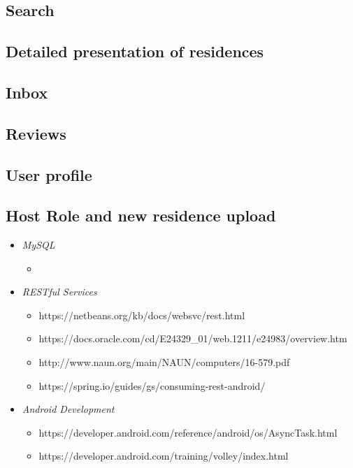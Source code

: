 \documentclass[12pt]{article}
\begin{document}
	\subsection{Search}
	
	\subsection{Detailed presentation of residences}
	\subsection{Inbox}
	\subsection{Reviews}
	\subsection{User profile}
	\subsection{Host Role and new residence upload}
	
	
	
	
	
	\begin{itemize}
		\item \emph{MySQL}
		\begin{itemize}
			\item 
		\end{itemize}
		\item \emph{RESTful Services}
		\begin{itemize}
			\item https://netbeans.org/kb/docs/websvc/rest.html
			\item https://docs.oracle.com/cd/E24329\_01/web.1211/e24983/overview.htm
			\item http://www.naun.org/main/NAUN/computers/16-579.pdf
			\item https://spring.io/guides/gs/consuming-rest-android/
		\end{itemize}
		\item \emph{Android Development}
		\begin{itemize}
			\item https://developer.android.com/reference/android/os/AsyncTask.html
			\item https://developer.android.com/training/volley/index.html
		\end{itemize}
	\end{itemize}
	
\end{document}
